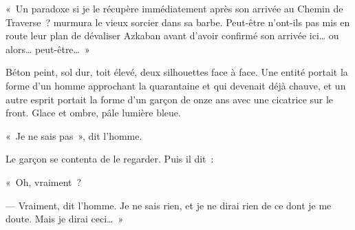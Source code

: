 «~Un paradoxe si je le récupère immédiatement après son arrivée au Chemin de Traverse~? murmura le vieux sorcier dans sa barbe.
Peut-être n'ont-ils pas mis en route leur plan de dévaliser Azkaban avant d'avoir confirmé son arrivée ici… ou alors… peut-être…~»

\later

Béton peint, sol dur, toit élevé, deux silhouettes face à face.
Une entité portait la forme d'un homme approchant la quarantaine et qui devenait déjà chauve, et un autre esprit portait la forme d'un garçon de onze ans avec une cicatrice sur le front.
Glace et ombre, pâle lumière bleue.

«~Je ne sais pas~», dit l'homme.

Le garçon se contenta de le regarder.
Puis il dit~:

«~Oh, vraiment~?

--- Vraiment, dit l'homme.
Je ne sais rien, et je ne dirai rien de ce dont je me doute.
Mais je dirai ceci…~»
